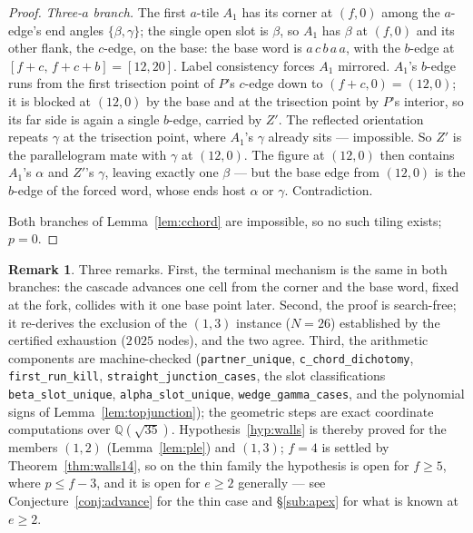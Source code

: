 \documentclass[11pt,reqno]{amsart}
\theoremstyle{plain}
\theoremstyle{definition}
\newtheorem{remark}[theorem]{Remark}
\newcommand{\Q}{\mathbb{Q}}
\begin{document}
\begin{proof}
\emph{Three-$a$ branch.} The first $a$-tile $A_1$ has its corner at $(f,0)$ among the $a$-edge's
end angles $\{\beta,\gamma\}$; the single open slot is $\beta$, so $A_1$ has $\beta$ at $(f,0)$
and its other flank, the $c$-edge, on the base: the base word is $a\,c\,b\,a\,a$, with the $b$-edge
at $[f+c,\,f+c+b]=[12,20]$. Label consistency forces $A_1$ mirrored. $A_1$'s $b$-edge runs from the
first trisection point of $P$'s $c$-edge down to $(f+c,0)=(12,0)$; it is blocked at $(12,0)$ by the
base and at the trisection point by $P$'s interior, so its far side is again a single $b$-edge,
carried by $Z'$. The reflected orientation repeats $\gamma$ at the trisection point, where $A_1$'s
$\gamma$ already sits — impossible. So $Z'$ is the parallelogram mate with $\gamma$ at $(12,0)$.
The figure at $(12,0)$ then contains $A_1$'s $\alpha$ and $Z'$'s $\gamma$, leaving exactly one
$\beta$ — but the base edge from $(12,0)$ is the $b$-edge of the forced word, whose ends host
$\alpha$ or $\gamma$. Contradiction.

Both branches of Lemma~\ref{lem:cchord} are impossible, so no such tiling exists; $p=0$.
\end{proof}

\begin{remark}\label{rem:walls13}
Three remarks. First, the terminal mechanism is the same in both branches: the cascade advances one
cell from the corner and the base word, fixed at the fork, collides with it one base point later.
Second, the proof is search-free; it re-derives the exclusion of the $(1,3)$ instance ($N=26$)
established by the certified exhaustion ($2\,025$ nodes), and the two agree. Third, the arithmetic
components are machine-checked (\texttt{partner\_unique}, \texttt{c\_chord\_dichotomy},
\texttt{first\_run\_kill}, \texttt{straight\_junction\_cases}, the slot classifications
\texttt{beta\_slot\_unique}, \texttt{alpha\_slot\_unique}, \texttt{wedge\_gamma\_cases}, and the
polynomial signs of Lemma~\ref{lem:topjunction}); the geometric steps are exact coordinate
computations over $\Q(\sqrt{35})$. Hypothesis~\ref{hyp:walls} is thereby proved for the members
$(1,2)$ (Lemma~\ref{lem:ple}) and $(1,3)$; $f=4$ is settled by Theorem~\ref{thm:walls14}, so on the
thin family the hypothesis is open for $f\ge5$, where $p\le f-3$, and it is open for $e\ge2$
generally --- see Conjecture~\ref{conj:advance} for the thin case and \S\ref{sub:apex} for what is
known at $e\ge2$.
\end{remark}
\end{document}
